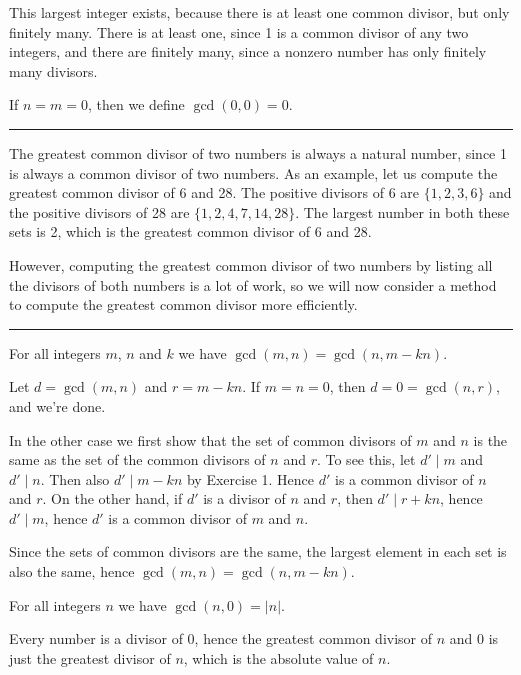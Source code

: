 \documentclass[letterpaper,10pt,english]{sphinxmanual}
\begin{document}
\sphinxAtStartPar
This largest integer exists, because there is at least one common divisor, but only finitely many. There is at least one, since 1 is a common divisor of any two integers, and there are finitely many, since a nonzero number has only finitely many divisors.

\sphinxAtStartPar
If \(n = m = 0\), then we define \(\gcd(0,0) = 0\).


\bigskip\hrule\bigskip


\sphinxAtStartPar
The greatest common divisor of two numbers is always a natural number, since 1 is always a common divisor of two numbers. As an example, let us compute the greatest common divisor of 6 and 28. The positive divisors of 6 are \(\{1, 2, 3, 6\}\) and the positive divisors of 28 are \(\{1, 2, 4, 7, 14, 28\}\). The largest number in both these sets is 2, which is the greatest common divisor of 6 and 28.

\sphinxAtStartPar
However, computing the greatest common divisor of two numbers by listing all the divisors of both numbers is a lot of work, so we will now consider a method to compute the greatest common divisor more efficiently.


\bigskip\hrule\bigskip


\sphinxAtStartPar
{} For all integers \(m\), \(n\) and \(k\) we have \(\gcd(m,n)=\gcd(n,m-kn)\).

\sphinxAtStartPar
{} Let \(d = \gcd(m,n)\) and \(r = m-kn\). If \(m = n = 0\), then \(d = 0 = \gcd(n,r)\), and we’re done.

\sphinxAtStartPar
In the other case we first show that the set of common divisors of \(m\) and \(n\) is the same as the set of the common divisors of \(n\) and \(r\). To see this, let \(d' \mid m\) and \(d' \mid n\). Then also \(d' \mid m - kn\) by Exercise 1. Hence \(d'\) is a common divisor of \(n\) and \(r\). On the other hand, if \(d'\) is a divisor of \(n\) and \(r\), then \(d' \mid r + kn\), hence \(d' \mid m\), hence \(d'\) is a common divisor of \(m\) and \(n\).

\sphinxAtStartPar
Since the sets of common divisors are the same, the largest element in each set is also the same, hence \(\gcd(m,n)=\gcd(n,m-kn)\).

\sphinxAtStartPar
{} For all integers \(n\) we have \(\gcd(n,0)=|n|\).

\sphinxAtStartPar
{} Every number is a divisor of 0, hence the greatest common divisor of \(n\) and 0 is just the greatest divisor of \(n\), which is the absolute value of \(n\).
\end{document}
